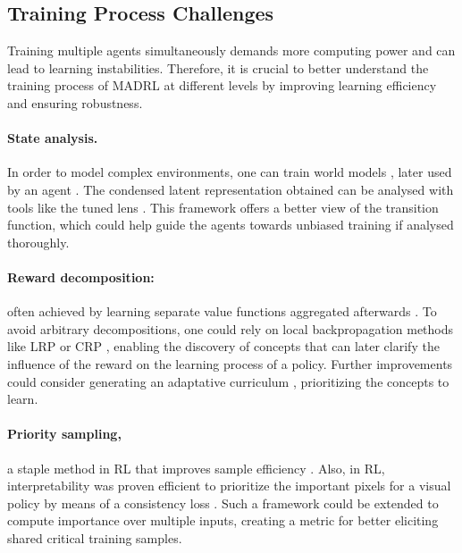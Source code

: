\subsection{Training Process Challenges}
Training multiple agents simultaneously demands more computing power and can lead to learning instabilities.
Therefore, it is crucial to better understand the training process of MADRL at different levels by improving learning efficiency and ensuring robustness. 

\paragraph{State analysis.}In order to model complex environments, one can train world models \cite{Bruce2024GenieGI}, later used by an agent \cite{Hafner2023MasteringDD}. 
The condensed latent representation obtained can be analysed \cite{Ivanitskiy2023StructuredWR}
with tools like the tuned lens \cite{Belrose2023ElicitingLP}. This framework offers a better view of the transition function, which could help guide the agents towards unbiased training if analysed thoroughly.

\paragraph{Reward decomposition:} often achieved by learning separate value functions aggregated afterwards \cite{Seijen2017HybridRA,Juozapaitis2019ExplainableRL}. 
To avoid arbitrary decompositions, one could rely on local backpropagation methods like LRP or CRP \cite{Bach2015OnPE,Achtibat2022FromAM}, enabling the discovery of concepts that can later clarify the influence of the reward on the learning process of a policy.
Further improvements could consider generating an adaptative curriculum \cite{Jiang2020PrioritizedLR}, prioritizing the concepts to learn.

\paragraph{Priority sampling,} a staple method in RL that improves sample efficiency \cite{Schaul2015PrioritizedER}. 
Also, in RL, interpretability was proven efficient to prioritize the important pixels for a visual policy by means of a consistency loss \cite{Bertoin2022LookWY}. Such a framework could be extended to compute importance over multiple inputs, creating a metric for better eliciting shared critical training samples.  

